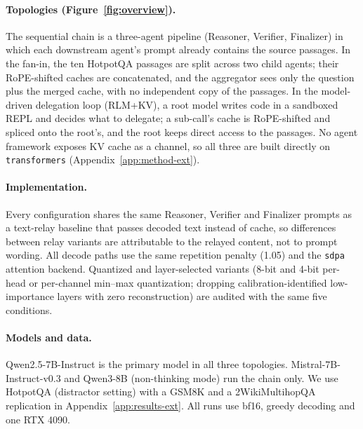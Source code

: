 \documentclass[11pt]{article}
\begin{document}
\paragraph{Topologies (Figure~\ref{fig:overview}).} The sequential chain is a three-agent
pipeline (Reasoner, Verifier, Finalizer) in which each downstream agent's
prompt already contains the source passages. In the fan-in, the
ten HotpotQA passages are split across two child agents; their
RoPE-shifted caches are concatenated, and the aggregator sees only the
question plus the merged cache, with no independent copy of the passages.
In the model-driven delegation loop (RLM+KV), a root model writes
code in a sandboxed REPL and decides what to delegate; a sub-call's cache
is RoPE-shifted and spliced onto the root's, and the root keeps direct
access to the passages. No agent framework exposes KV cache as a
channel, so all three are built directly on \texttt{transformers}
\citep{transformers2020} (Appendix~\ref{app:method-ext}).

\paragraph{Implementation.} Every configuration shares the same
Reasoner, Verifier and Finalizer prompts as a text-relay baseline that
passes decoded text instead of cache, so differences between relay
variants are attributable to the relayed content, not to prompt wording.
All decode paths use the same repetition penalty (1.05) and the
\texttt{sdpa} attention backend. Quantized and layer-selected variants
(8-bit and 4-bit per-head or per-channel min--max quantization; dropping
calibration-identified low-importance layers with zero reconstruction) are
audited with the same five conditions.

\paragraph{Models and data.} Qwen2.5-7B-Instruct \citep{qwen2p5_2024} is
the primary model in all three topologies. Mistral-7B-Instruct-v0.3
\citep{mistral7b2023} and Qwen3-8B \citep{qwen3_2025} (non-thinking mode)
run the chain only. We use HotpotQA (distractor setting) with a GSM8K
\citep{gsm8k2021} and a 2WikiMultihopQA replication in
Appendix~\ref{app:results-ext}. All runs use bf16, greedy decoding and one
RTX 4090.
\end{document}
